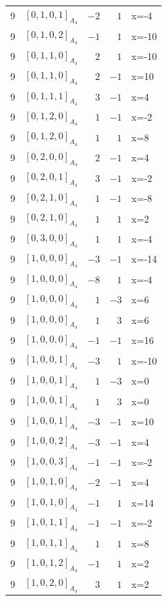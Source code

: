 \documentclass[11pt]{article}
\newcommand{\Dynkin}[1]{#1}
\begin{document}
\begin{longtable}{r l r r l}
9 & $\Dynkin{[0,1,0,1]_{A_4}}$ & $-2$ & $1$ & x=-4\\
9 & $\Dynkin{[0,1,0,2]_{A_4}}$ & $-1$ & $1$ & x=-10\\
9 & $\Dynkin{[0,1,1,0]_{A_4}}$ & $2$ & $1$ & x=-10\\
9 & $\Dynkin{[0,1,1,0]_{A_4}}$ & $2$ & $-1$ & x=10\\
9 & $\Dynkin{[0,1,1,1]_{A_4}}$ & $3$ & $-1$ & x=4\\
9 & $\Dynkin{[0,1,2,0]_{A_4}}$ & $1$ & $-1$ & x=-2\\
9 & $\Dynkin{[0,1,2,0]_{A_4}}$ & $1$ & $1$ & x=8\\
9 & $\Dynkin{[0,2,0,0]_{A_4}}$ & $2$ & $-1$ & x=4\\
9 & $\Dynkin{[0,2,0,1]_{A_4}}$ & $3$ & $-1$ & x=-2\\
9 & $\Dynkin{[0,2,1,0]_{A_4}}$ & $1$ & $-1$ & x=-8\\
9 & $\Dynkin{[0,2,1,0]_{A_4}}$ & $1$ & $1$ & x=2\\
9 & $\Dynkin{[0,3,0,0]_{A_4}}$ & $1$ & $1$ & x=-4\\
9 & $\Dynkin{[1,0,0,0]_{A_4}}$ & $-3$ & $-1$ & x=-14\\
9 & $\Dynkin{[1,0,0,0]_{A_4}}$ & $-8$ & $1$ & x=-4\\
9 & $\Dynkin{[1,0,0,0]_{A_4}}$ & $1$ & $-3$ & x=6\\
9 & $\Dynkin{[1,0,0,0]_{A_4}}$ & $1$ & $3$ & x=6\\
9 & $\Dynkin{[1,0,0,0]_{A_4}}$ & $-1$ & $-1$ & x=16\\
9 & $\Dynkin{[1,0,0,1]_{A_4}}$ & $-3$ & $1$ & x=-10\\
9 & $\Dynkin{[1,0,0,1]_{A_4}}$ & $1$ & $-3$ & x=0\\
9 & $\Dynkin{[1,0,0,1]_{A_4}}$ & $1$ & $3$ & x=0\\
9 & $\Dynkin{[1,0,0,1]_{A_4}}$ & $-3$ & $-1$ & x=10\\
9 & $\Dynkin{[1,0,0,2]_{A_4}}$ & $-3$ & $-1$ & x=4\\
9 & $\Dynkin{[1,0,0,3]_{A_4}}$ & $-1$ & $-1$ & x=-2\\
9 & $\Dynkin{[1,0,1,0]_{A_4}}$ & $-2$ & $-1$ & x=4\\
9 & $\Dynkin{[1,0,1,0]_{A_4}}$ & $-1$ & $1$ & x=14\\
9 & $\Dynkin{[1,0,1,1]_{A_4}}$ & $-1$ & $-1$ & x=-2\\
9 & $\Dynkin{[1,0,1,1]_{A_4}}$ & $1$ & $1$ & x=8\\
9 & $\Dynkin{[1,0,1,2]_{A_4}}$ & $-1$ & $1$ & x=2\\
9 & $\Dynkin{[1,0,2,0]_{A_4}}$ & $3$ & $1$ & x=2\\

\end{longtable}
\end{document}
